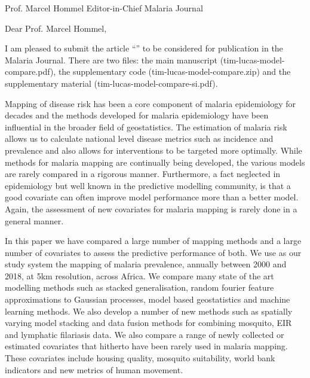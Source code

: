 \documentclass[10pt, a4paper]{letter} %
\begin{document}

\begin{letter}{
Prof. Marcel Hommel
Editor-in-Chief
Malaria Journal
}


\opening{Dear Prof. Marcel Hommel,}

I am pleased to submit the article ``'' to be considered for publication in the Malaria Journal.
There are two files: the main manuscript (tim-lucas-model-compare.pdf), the supplementary code (tim-lucas-model-compare.zip) and the supplementary material (tim-lucas-model-compare-si.pdf).

Mapping of disease risk has been a core component of malaria epidemiology for decades and the methods developed for malaria epidemiology have been influential in the broader field of geostatistics.
The estimation of malaria risk allows us to calculate national level disease metrics such as incidence and prevalence and also allows for interventions to be targeted more optimally.
While methods for malaria mapping are continually being developed, the various models are rarely compared in a rigorous manner.
Furthermore, a fact neglected in epidemiology but well known in the predictive modelling community, is that a good covariate can often improve model performance more than a better model.
Again, the assessment of new covariates for malaria mapping is rarely done  in a general manner.

In this paper we have compared a large number of mapping methods and a large number of covariates to assess the predictive performance of both.
We use as our study system the mapping of malaria prevalence, annually between 2000 and 2018, at 5km resolution, across Africa.
We compare many state of the art modelling methods such as stacked generalisation, random fourier feature approximations to Gaussian processes, model based geostatistics and machine learning methods.
We also develop a number of new methods such as spatially varying model stacking and data fusion methods for combining mosquito, EIR and lymphatic filariasis data.
We also compare a range of newly collected or estimated covariates that hitherto have been rarely used in malaria mapping.
These covariates include housing quality, mosquito suitability, world bank indicators and new metrics of human movement.


\end{letter}
\end{document}
